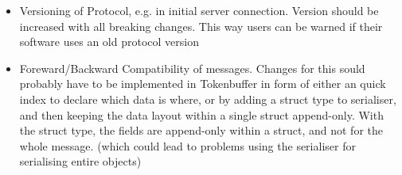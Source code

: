 \documentclass[12pt,pdftex,a4paper]{scrbook}
\begin{document}
	\begin{itemize}
		\item Versioning of Protocol, e.g. in initial server connection. Version should be increased with all breaking changes. This way users can be warned if their software uses an old protocol version
		\item Foreward/Backward Compatibility of messages. Changes for this sould probably have to be implemented in Tokenbuffer in form of either an quick index to declare which data is where, or by adding a struct type to serialiser, and then keeping the data layout within a single struct append-only. With the struct type, the fields are append-only within a struct, and not for the whole message. (which could lead to problems using the serialiser for serialising entire objects)
	\end{itemize}
\end{document}
